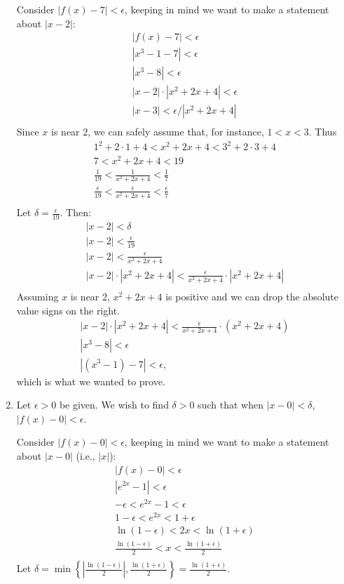 \begin{enumialphparenastyle}
\begin{ex}
\begin{sol}
\begin{enumerate}
{Consider $|f(x)-7|<\epsilon$, keeping in  mind we want to make a statement about $|x-2|$:
\begin{gather*}
|f(x) -7 | < \epsilon \\
|x^3-1 -7 |<\epsilon \\
| x^3-8 | < \epsilon \\
| x-2 |\cdot|x^2+2x+4| < \epsilon \\
| x-3 | < \epsilon/|x^2+2x+4| \\
\end{gather*}
Since $x$ is near 2, we can safely assume that, for instance, $1<x<3$. Thus
\begin{gather*}
1^2+2\cdot1+4<x^2+2x+4<3^2+2\cdot3+4 \\
7 < x^2+2x+4 < 19 \\
\frac{1}{19} < \frac{1}{x^2+2x+4} < \frac{1}{7} \\
\frac{\epsilon}{19} < \frac{\epsilon}{x^2+2x+4} < \frac{\epsilon}{7} \\
\end{gather*}
Let $\delta =\frac{\epsilon}{19}$. Then:
\begin{gather*}
|x-2|<\delta \\
|x-2| < \frac{\epsilon}{19}\\
|x-2| < \frac{\epsilon}{x^2+2x+4}\\
|x-2|\cdot|x^2+2x+4| < \frac{\epsilon}{x^2+2x+4}\cdot|x^2+2x+4|\\
\end{gather*}
Assuming $x$ is near 2, $x^2+2x+4$ is positive and we can drop the absolute value signs on the right.
\begin{gather*}
|x-2|\cdot|x^2+2x+4| < \frac{\epsilon}{x^2+2x+4}\cdot(x^2+2x+4)\\
|x^3-8| < \epsilon\\
|(x^3-1) - 7| < \epsilon,
\end{gather*}
which is what we wanted to prove.
}
\item {Let $\epsilon >0$ be given. We wish to find $\delta >0$ such that when $|x-0|<\delta$, $|f(x)-0|<\epsilon$. 

Consider $|f(x)-0|<\epsilon$, keeping in  mind we want to make a statement about $|x-0|$ (i.e., $|x|$):
\begin{gather*}
|f(x) -0 | < \epsilon \\
|e^{2x}-1 |<\epsilon \\
-\epsilon< e^{2x}-1 < \epsilon \\
1-\epsilon< e^{2x} < 1+\epsilon \\
\ln (1-\epsilon) < 2x < \ln (1+\epsilon) \\
\frac{\ln (1-\epsilon)}{2} < x < \frac{\ln (1+\epsilon)}{2} \\
\end{gather*}
Let $\delta = \min\left\{\left|\frac{\ln(1-\epsilon)}{2}\right|,\frac{\ln(1+\epsilon)}{2}\right\}=\frac{\ln(1+\epsilon)}{2}.$

}
\end{enumerate}
\end{sol}
\end{ex}
\end{enumialphparenastyle}
